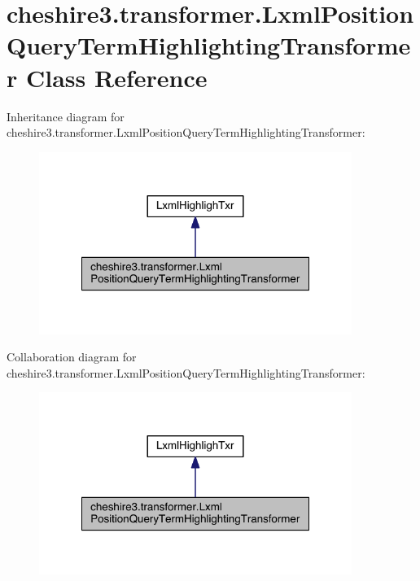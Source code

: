 \hypertarget{classcheshire3_1_1transformer_1_1_lxml_position_query_term_highlighting_transformer}{\section{cheshire3.\-transformer.\-Lxml\-Position\-Query\-Term\-Highlighting\-Transformer Class Reference}
\label{classcheshire3_1_1transformer_1_1_lxml_position_query_term_highlighting_transformer}
}


Inheritance diagram for cheshire3.\-transformer.\-Lxml\-Position\-Query\-Term\-Highlighting\-Transformer\-:
\nopagebreak
\begin{figure}[H]
\begin{center}
\leavevmode
\includegraphics[width=288pt]{classcheshire3_1_1transformer_1_1_lxml_position_query_term_highlighting_transformer__inherit__graph}
\end{center}
\end{figure}


Collaboration diagram for cheshire3.\-transformer.\-Lxml\-Position\-Query\-Term\-Highlighting\-Transformer\-:
\nopagebreak
\begin{figure}[H]
\begin{center}
\leavevmode
\includegraphics[width=288pt]{classcheshire3_1_1transformer_1_1_lxml_position_query_term_highlighting_transformer__coll__graph}
\end{center}
\end{figure}
